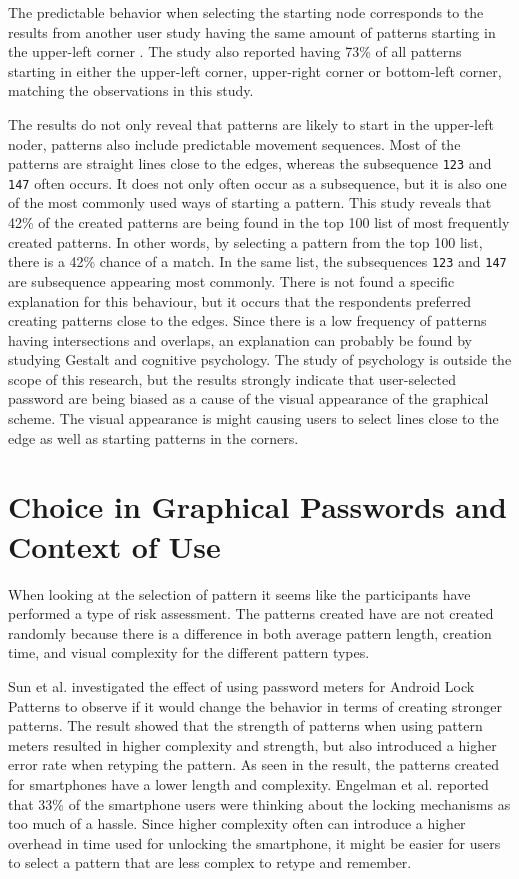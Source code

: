       The predictable behavior when selecting the starting node corresponds to the results from another user study having the same amount of patterns starting in the upper-left corner \cite{Uellenbeck}. The study also reported having 73\% of all patterns starting in either the upper-left corner, upper-right corner or bottom-left corner, matching the observations in this study.

       The results do not only reveal that patterns are likely to start in the upper-left noder, patterns also include predictable movement sequences. Most of the patterns are straight lines close to the edges, whereas the subsequence \texttt{123} and \texttt{147} often occurs. It does not only often occur as a subsequence, but it is also one of the most commonly used ways of starting a pattern. This study reveals that 42\% of the created patterns are being found in the top 100 list of most frequently created patterns. In other words, by selecting a pattern from the top 100 list, there is a 42\% chance of a match. In the same list, the subsequences \texttt{123} and \texttt{147} are subsequence appearing most commonly. There is not found a specific explanation for this behaviour, but it occurs that the respondents preferred creating patterns close to the edges. Since there is a low frequency of patterns having intersections and overlaps, an explanation can probably be found by studying Gestalt and cognitive psychology. The study of psychology is outside the scope of this research, but the results strongly indicate that user-selected password are being biased as a cause of the visual appearance of the graphical scheme. The visual appearance is might causing users to select lines close to the edge as well as starting patterns in the corners.

  \section{Choice in Graphical Passwords and Context of Use}\label{sec:discussionContext}
    
    When looking at the selection of pattern it seems like the participants have performed a type of risk assessment. The patterns created have are not created randomly because there is a difference in both average pattern length, creation time, and visual complexity for the different pattern types.

    Sun et al. \cite{Sun} investigated the effect of using password meters for Android Lock Patterns to observe if it would change the behavior in terms of creating stronger patterns. The result showed that the strength of patterns when using pattern meters resulted in higher complexity and strength, but also introduced a higher error rate when retyping the pattern. As seen in the result, the patterns created for smartphones have a lower length and complexity. Engelman et al. \cite{Egelman} reported that 33\% of the smartphone users were thinking about the locking mechanisms as too much of a hassle. Since higher complexity often can introduce a higher overhead in time used for unlocking the smartphone, it might be easier for users to select a pattern that are less complex to retype and remember.   

